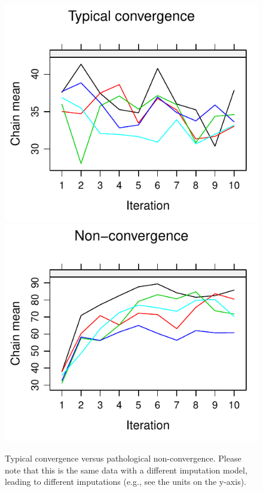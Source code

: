\documentclass[Royal,times,sageh]{sagej}
\begin{document}
\begin{figure}

{\centering \includegraphics[width=.49\linewidth]{2.Manuscript_files/figure-latex/non-conv-1} \includegraphics[width=.49\linewidth]{2.Manuscript_files/figure-latex/non-conv-2} 

}

\caption{Typical convergence versus pathological non-convergence. Please note that this is the same data with a different imputation model, leading to different imputations (e.g., see the units on the y-axis).}\label{fig:non-conv}
\end{figure}
\end{document}

